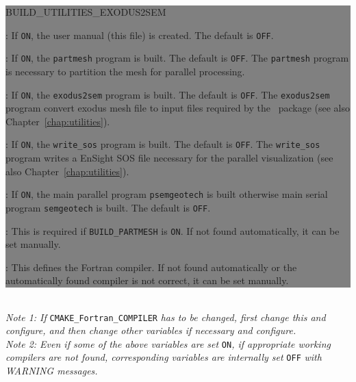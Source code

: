 \colorbox{gray}{
\parbox{15.5cm}{
\begin{adescription}{BUILD\_UTILITIES\_EXODUS2SEM}
\item[BUILD\_DOCUMENTATION]           : If \texttt{ON}, the user manual (this file) is created. The default is \texttt{OFF}.
\item[BUILD\_PARTMESH]                : If \texttt{ON}, the \texttt{partmesh} program is built. The default is \texttt{OFF}. The \texttt{partmesh} program is necessary to partition the mesh for parallel processing.
\item[BUILD\_UTILITIES\_EXODUS2SEM]   : If \texttt{ON}, the \texttt{exodus2sem} program is built. The default is \texttt{OFF}. The \texttt{exodus2sem} program convert exodus mesh file to input files required by the \pack\ package (see also Chapter~\ref{chap:utilities}).
\item[BUILD\_UTILITIES\_WRITE\_SOS]   : If \texttt{ON}, the \texttt{write\_sos} program is built. The default is \texttt{OFF}. The \texttt{write\_sos} program writes a EnSight SOS file necessary for the parallel visualization (see also Chapter~\ref{chap:utilities}).
\item[ENABLE\_MPI]                    : If \texttt{ON}, the main parallel program \texttt{psemgeotech} is built otherwise main serial program \texttt{semgeotech} is built. The default is \texttt{OFF}.
\item[SCOTCH\_LIBRARY\_PATH]          : This is required if \texttt{BUILD\_PARTMESH} is \texttt{ON}. If not found automatically, it can be set manually.
\item[CMAKE\_Fortran\_COMPILER]       : This defines the Fortran compiler. If not found automatically or the automatically found compiler is not correct, it can be set manually.
\end{adescription}
}}\\

{\emph{Note 1: If}} \texttt{CMAKE\_Fortran\_COMPILER} {\emph{has to be changed, first change this and configure, and then change other variables if necessary and configure.}}\\
{\emph{Note 2: Even if some of the above variables are set }} \texttt{ON}{\emph{, if appropriate working compilers are not found, corresponding variables are internally set}} \texttt{OFF} {\emph{with WARNING messages.}}

